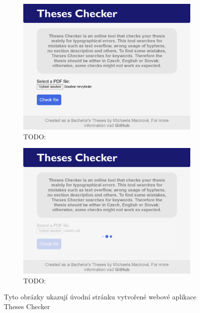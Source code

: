 \begin{figure}[H]
    
    \begin{subfigure}[b]{0.496\linewidth}
        \includegraphics[width=\linewidth]{obrazky-figures/screenshot-page1-small.png}
        \caption{TODO:}
        \label{pic_theses_checker_page1_sub1}
    \end{subfigure}
    \hfill
    \begin{subfigure}[b]{0.496\linewidth}
        \includegraphics[width=\linewidth]{obrazky-figures/screenshot-loading-small.png}
        \caption{TODO:}
        \label{pic_theses_checker_page1_sub2}
    \end{subfigure}
    \caption[]{Tyto obrázky ukazují úvodní stránku vytvořené webové aplikace Theses Checker}
    \label{pic_theses_checker_page1}
\end{figure}


